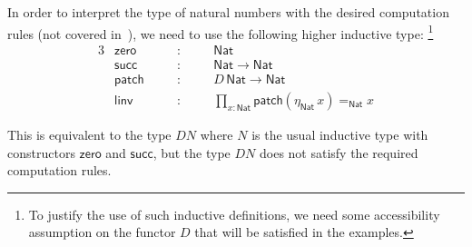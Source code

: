 \documentclass[10pt,a4paper,draft]{article}
\newcommand{\Nat}{\mathsf{Nat}}
\newcommand{\Id}{\mathsf{Id}}
\newcommand{\UU}{\mathcal{U}}%
\newcommand{\GG}{\mathsf{isMod}}
\newcommand{\patch}{\mathsf{patch}}
\newcommand{\leftinv}{\mathsf{linv}}
\newcommand{\zero}{\mathsf{zero}}
\newcommand{\SUCC}{\mathsf{succ}}
\newcommand{\D}{D}              %
\renewcommand{\~}{\widetilde}
\theoremstyle{definition}
\theoremstyle{remark} %
\begin{document}




In order to interpret the type of natural numbers with the desired
computation rules (not covered in~\cite{Quirin16}),
we need to use the following higher inductive type:%
\footnote{To justify the use
  of such inductive definitions, we need some accessibility assumption on the functor
  $\D$ that will be satisfied in the examples.}
\begin{alignat*}{3}
  & \zero     & \quad & : & \quad & \Nat \\
  & \SUCC     & \quad & : & \quad & \Nat \rightarrow \Nat \\
  & \patch    & \quad & : & \quad & \D\,\Nat \rightarrow \Nat \\
  & \leftinv  & \quad & : & \quad & \textstyle\prod_{x : \Nat} \patch (\eta_\Nat\, x) =_{\Nat} x
\end{alignat*}

This is equivalent to the type $\D N$ where $N$ is the usual inductive
type with constructors $\zero$ and $\SUCC$, but the type $\D N$ does not satisfy
the required computation rules.
\end{document}
